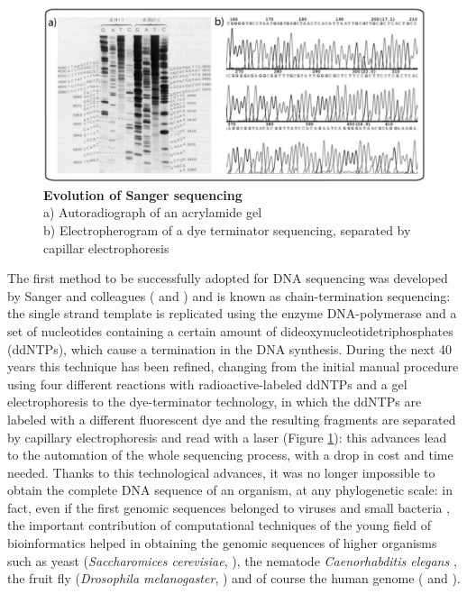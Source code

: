 \begin{figure}[!tb]
	\center
    \includegraphics[width=1\textwidth]{figures/Introduction/thesis_1}
	\caption{\label{fig:sanger}\textbf{Evolution of Sanger sequencing}\\
			a) Autoradiograph of an acrylamide gel \cite{sanger1977dna} \\
			b) Electropherogram of a dye terminator sequencing, separated by capillar electrophoresis \cite{electropherogram}}
\end{figure}

The first method to be successfully adopted for DNA sequencing was developed by Sanger and colleagues (\cite{Sanger1975441} and \cite{sanger1977dna}) and is known as chain-termination sequencing: the single strand template is replicated using the enzyme DNA-polymerase and a set of nucleotides containing a certain amount of dideoxynucleotidetriphosphates (ddNTPs), which cause a termination in the DNA synthesis. During the next 40 years this technique has been refined, changing from the initial manual procedure using four different reactions with radioactive-labeled ddNTPs and a gel electrophoresis to the dye-terminator technology, in which the ddNTPs are labeled with a different fluorescent dye and the resulting fragments are separated by capillary electrophoresis and read with a laser (Figure \ref{fig:sanger}): this advances lead to the automation of the whole sequencing process, with a drop in cost and time needed. Thanks to this technological advances, it was no longer impossible to obtain the complete DNA sequence of an organism, at any phylogenetic scale: in fact, even if the first genomic sequences belonged to viruses \cite{sanger1978nucleotide} and small bacteria \cite{fleischmann1995whole}, the important contribution of computational techniques of the young field of bioinformatics helped in obtaining the genomic sequences of higher organisms such as yeast (\textit{Saccharomices cerevisiae}, \cite{goffeau1996life}), the nematode \textit{Caenorhabditis elegans} \cite{caenorhabditis1998genome}, the fruit fly (\textit{Drosophila melanogaster}, \cite{adams2000genome}) and of course the human genome (\cite{lander2001initial} and \cite{venter2001sequence}).

